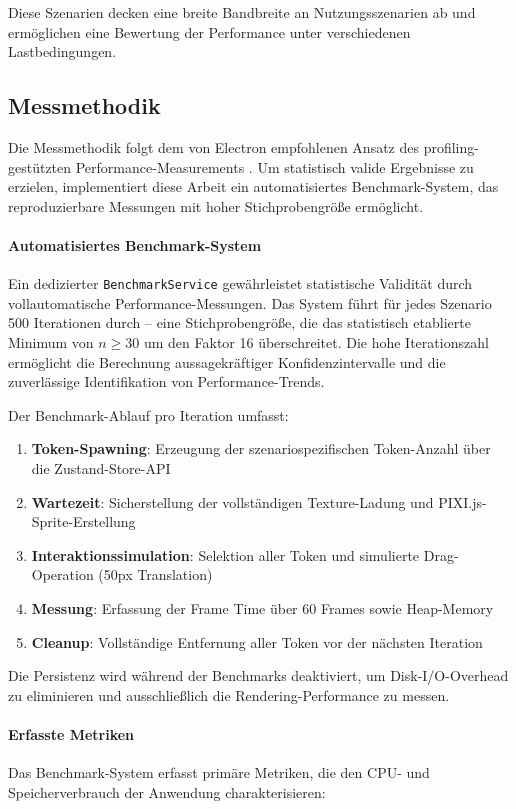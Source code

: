 Diese Szenarien decken eine breite Bandbreite an Nutzungsszenarien ab und ermöglichen eine Bewertung der Performance unter verschiedenen Lastbedingungen.

\subsection{Messmethodik}

Die Messmethodik folgt dem von Electron empfohlenen Ansatz des profiling-gestützten Performance-Measurements \autocite{ElectronPerformanceGuide2024}. Um statistisch valide Ergebnisse zu erzielen, implementiert diese Arbeit ein automatisiertes Benchmark-System, das reproduzierbare Messungen mit hoher Stichprobengröße ermöglicht.

\paragraph{Automatisiertes Benchmark-System}
Ein dedizierter \texttt{BenchmarkService} gewährleistet statistische Validität durch vollautomatische Performance-Messungen. Das System führt für jedes Szenario 500 Iterationen durch -- eine Stichprobengröße, die das statistisch etablierte Minimum von $n \geq 30$ um den Faktor 16 überschreitet. Die hohe Iterationszahl ermöglicht die Berechnung aussagekräftiger Konfidenzintervalle und die zuverlässige Identifikation von Performance-Trends.

Der Benchmark-Ablauf pro Iteration umfasst:
\begin{enumerate}
	\item \textbf{Token-Spawning}: Erzeugung der szenariospezifischen Token-Anzahl über die Zustand-Store-\ac{API}
	\item \textbf{Wartezeit}: Sicherstellung der vollständigen Texture-Ladung und PIXI.js-Sprite-Erstellung
	\item \textbf{Interaktionssimulation}: Selektion aller Token und simulierte Drag-Operation (50px Translation)
	\item \textbf{Messung}: Erfassung der Frame Time über 60 Frames sowie Heap-Memory
	\item \textbf{Cleanup}: Vollständige Entfernung aller Token vor der nächsten Iteration
\end{enumerate}

Die Persistenz wird während der Benchmarks deaktiviert, um Disk-\ac{I/O}-Overhead zu eliminieren und ausschließlich die Rendering-Performance zu messen.

\paragraph{Erfasste Metriken}
Das Benchmark-System erfasst primäre Metriken, die den \ac{CPU}- und Speicherverbrauch der Anwendung charakterisieren:

